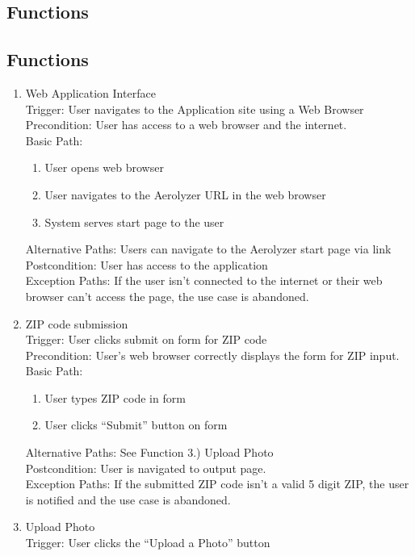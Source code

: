 \documentclass[journal,10pt,draftclsnofoot,onecolumn]{IEEEtran}
\begin{document}
\begin{singlespace}
\section{Functions}
\subsection{Functions}
\begin{enumerate}
\item Web Application Interface\\
Trigger: User navigates to the Application site using a Web Browser\\
Precondition: User has access to a web browser and the internet.\\
Basic Path:\begin{enumerate}
\item User opens web browser
\item User navigates to the Aerolyzer URL in the web browser
\item System serves start page to the user
\end{enumerate}
Alternative Paths: Users can navigate to the Aerolyzer start page via link\\
Postcondition: User has access to the application\\
Exception Paths: If the user isn't connected to the internet or their web browser can't access the page, the use case is abandoned.
\\
\item ZIP code submission\\
Trigger: User clicks submit on form for ZIP code\\
Precondition: User's web browser correctly displays the form for ZIP input.\\
Basic Path:\begin{enumerate}
\item User types ZIP code in form
\item User clicks “Submit” button on form
\end{enumerate}
Alternative Paths: See Function 3.) Upload Photo\\
Postcondition: User is navigated to output page.\\
Exception Paths: If the submitted ZIP code isn't a valid 5 digit ZIP, the user is notified and the use case is abandoned.
\\
\item Upload Photo\\
Trigger: User clicks the “Upload a Photo” button\\

\end{enumerate}
\end{singlespace}
\end{document}
